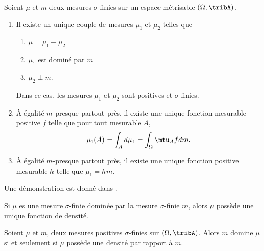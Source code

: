 \begin{theorem}
    Soient \( \mu\) et \( m\) deux mesures \( \sigma\)-finies sur un espace métrisable \( (\Omega,\tribA)\).
    \begin{enumerate}
        \item
            Il existe un unique couple de mesures \( \mu_1\) et \( \mu_2\) telles que
            \begin{enumerate}
                \item
                    \( \mu=\mu_1+\mu_2\)
                \item
                    \( \mu_1\) est dominé par \( m\)
                \item
                    \( \mu_2\perp m\).
            \end{enumerate}
            Dans ce cas, les mesures \( \mu_1\) et \( \mu_2\) sont positives et \( \sigma\)-finies.
        \item
            À égalité \(  m\)-presque partout près, il existe une unique fonction mesurable positive \( f\) telle que pour tout mesurable \( A\),
            \begin{equation}
                \mu_1(A)=\int_Ad\mu_1=\int_{\Omega}\mtu_Afd m.
            \end{equation}
        \item
            À égalité \( m\)-presque partout près, il existe une unique fonction positive mesurable \( h\) telle que \( \mu_1=hm\).
    \end{enumerate}
\end{theorem}
Une démonstration est donné dans \cite{NikoLi}.

\begin{corollary}   \label{CorZDkhwS}
    Si \( \mu\) es une mesure \( \sigma\)-finie dominée par la mesure \( \sigma\)-finie \( m\), alors \( \mu\) possède une unique fonction de densité.
\end{corollary}

\begin{corollary}       \label{CorDomDens}
    Soient \( \mu\) et \( m\), deux mesures positives \( \sigma\)-finies sur \( (\Omega,\tribA)\). Alors \( m\) domine \( \mu\) si et seulement si \( \mu\) possède une densité par rapport à \( m\).
\end{corollary}
 
